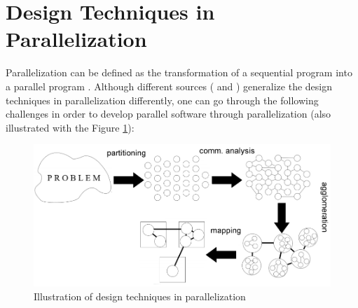 \section{Design Techniques in Parallelization} \label{designtech}
Parallelization can be defined as the transformation of a sequential program into a parallel program \cite{springerparallel}. Although different sources (\cite{springerparallel} and \cite{lukas1}) generalize the design techniques in parallelization differently, one can go through the following challenges in order to develop parallel software through parallelization (also illustrated with the Figure \ref{fig:designtechniques}):
\begin{figure}[!ht]
	\centering
	\captionsetup{justification=centering}
	\includegraphics[width=\textwidth]{content/images/designtechniques.png}
	\caption{Illustration of design techniques in parallelization \cite{lukas1}}
	\label{fig:designtechniques}
\end{figure}


